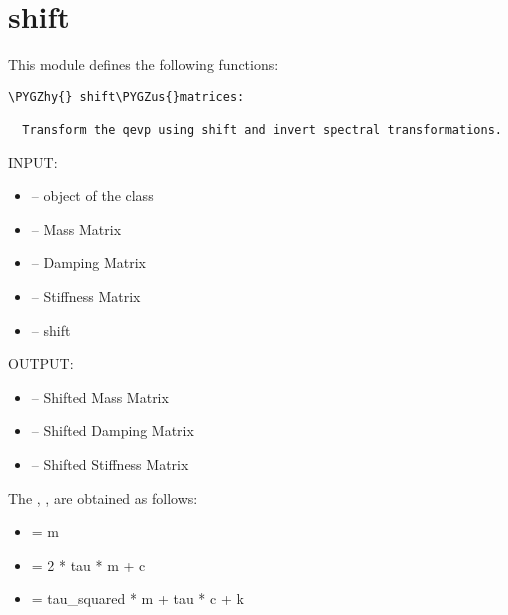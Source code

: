 \documentclass[letterpaper,10pt,english]{sphinxmanual}
\def\PYGZus{\char`\_}
\def\PYGZhy{\char`\-}
\begin{document}
\section{shift}
\label{index:shift}\label{index:module-shift}
This module defines the following functions:

\begin{Verbatim}[commandchars=\\\{\}]
\PYGZhy{} shift\PYGZus{}matrices:

  Transform the qevp using shift and invert spectral transformations.
\end{Verbatim}

\begin{fulllineitems}
\label{index:shift.shift_matrices}
INPUT:
\begin{itemize}
\item {} 
 -- object of the class 

\item {} 
 -- Mass Matrix

\item {} 
 -- Damping Matrix

\item {} 
 -- Stiffness Matrix

\item {} 
 -- shift

\end{itemize}

OUTPUT:
\begin{itemize}
\item {} 
 -- Shifted Mass Matrix

\item {} 
 -- Shifted Damping Matrix

\item {} 
 -- Shifted Stiffness Matrix

\end{itemize}

The  ,  ,  are obtained as follows:
\begin{itemize}
\item {} 
 = m

\item {} 
 = 2 * tau * m + c

\item {} 
 = tau\_squared * m + tau * c + k

\end{itemize}

\end{fulllineitems}
\end{document}
